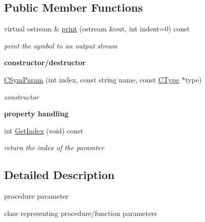\subsection*{Public Member Functions}
\begin{DoxyCompactItemize}
\item 
virtual ostream \& \hyperlink{classCSymParam_ad8acc1c101678733957f9ec0ecf72157}{print} (ostream \&out, int indent=0) const 
\begin{DoxyCompactList}\small\item\em print the symbol to an output stream \end{DoxyCompactList}\end{DoxyCompactItemize}
\begin{Indent}{\bf constructor/destructor}\par
\begin{DoxyCompactItemize}
\item 
\hyperlink{classCSymParam_a1453617f154d06f146d6297aa08e9801}{C\-Sym\-Param} (int index, const string name, const \hyperlink{classCType}{C\-Type} $\ast$type)
\begin{DoxyCompactList}\small\item\em constructor \end{DoxyCompactList}\end{DoxyCompactItemize}
\end{Indent}
\begin{Indent}{\bf property handling}\par
\begin{DoxyCompactItemize}
\item 
\hypertarget{classCSymParam_a41df89e8ac7a1d43af83cf70e816fe4a}{int \hyperlink{classCSymParam_a41df89e8ac7a1d43af83cf70e816fe4a}{Get\-Index} (void) const }\label{classCSymParam_a41df89e8ac7a1d43af83cf70e816fe4a}

\begin{DoxyCompactList}\small\item\em return the index of the paramter \end{DoxyCompactList}\end{DoxyCompactItemize}
\end{Indent}


\subsection{Detailed Description}
procedure parameter 

class representing procedure/function parameters 

